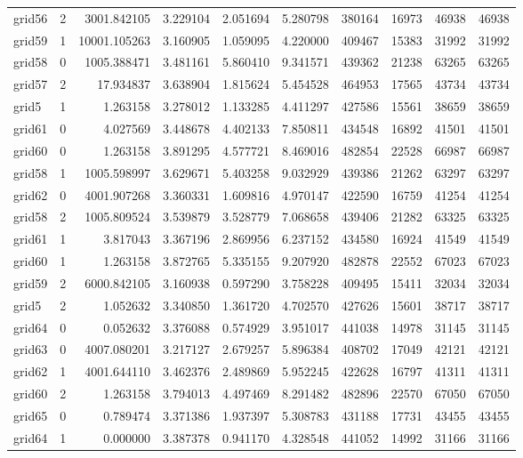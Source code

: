 \begin{longtable}{|l|r|r|r|r|r|r|r|r|r|}
grid56 & 2 & 3001.842105 & 3.229104 & 2.051694 & 5.280798 & 380164 & 16973 & 46938 & 46938 \\
grid59 & 1 & 10001.105263 & 3.160905 & 1.059095 & 4.220000 & 409467 & 15383 & 31992 & 31992 \\
grid58 & 0 & 1005.388471 & 3.481161 & 5.860410 & 9.341571 & 439362 & 21238 & 63265 & 63265 \\
grid57 & 2 & 17.934837 & 3.638904 & 1.815624 & 5.454528 & 464953 & 17565 & 43734 & 43734 \\
grid5 & 1 & 1.263158 & 3.278012 & 1.133285 & 4.411297 & 427586 & 15561 & 38659 & 38659 \\
grid61 & 0 & 4.027569 & 3.448678 & 4.402133 & 7.850811 & 434548 & 16892 & 41501 & 41501 \\
grid60 & 0 & 1.263158 & 3.891295 & 4.577721 & 8.469016 & 482854 & 22528 & 66987 & 66987 \\
grid58 & 1 & 1005.598997 & 3.629671 & 5.403258 & 9.032929 & 439386 & 21262 & 63297 & 63297 \\
grid62 & 0 & 4001.907268 & 3.360331 & 1.609816 & 4.970147 & 422590 & 16759 & 41254 & 41254 \\
grid58 & 2 & 1005.809524 & 3.539879 & 3.528779 & 7.068658 & 439406 & 21282 & 63325 & 63325 \\
grid61 & 1 & 3.817043 & 3.367196 & 2.869956 & 6.237152 & 434580 & 16924 & 41549 & 41549 \\
grid60 & 1 & 1.263158 & 3.872765 & 5.335155 & 9.207920 & 482878 & 22552 & 67023 & 67023 \\
grid59 & 2 & 6000.842105 & 3.160938 & 0.597290 & 3.758228 & 409495 & 15411 & 32034 & 32034 \\
grid5 & 2 & 1.052632 & 3.340850 & 1.361720 & 4.702570 & 427626 & 15601 & 38717 & 38717 \\
grid64 & 0 & 0.052632 & 3.376088 & 0.574929 & 3.951017 & 441038 & 14978 & 31145 & 31145 \\
grid63 & 0 & 4007.080201 & 3.217127 & 2.679257 & 5.896384 & 408702 & 17049 & 42121 & 42121 \\
grid62 & 1 & 4001.644110 & 3.462376 & 2.489869 & 5.952245 & 422628 & 16797 & 41311 & 41311 \\
grid60 & 2 & 1.263158 & 3.794013 & 4.497469 & 8.291482 & 482896 & 22570 & 67050 & 67050 \\
grid65 & 0 & 0.789474 & 3.371386 & 1.937397 & 5.308783 & 431188 & 17731 & 43455 & 43455 \\
grid64 & 1 & 0.000000 & 3.387378 & 0.941170 & 4.328548 & 441052 & 14992 & 31166 & 31166 \\

\end{longtable}
